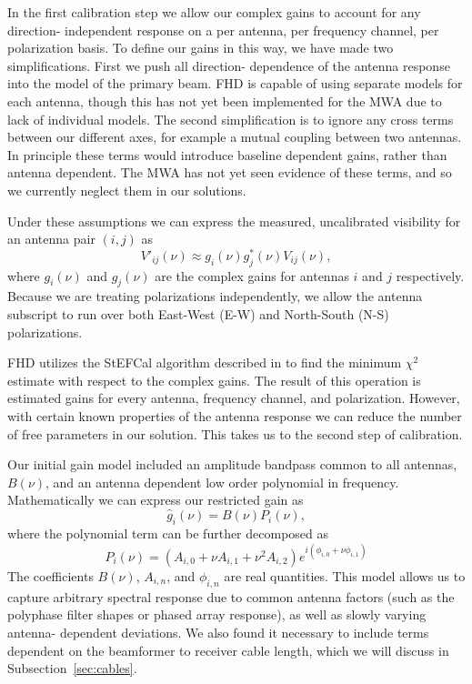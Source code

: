 \documentclass[iop]{emulateapj}
\begin{document}
In the first calibration step we allow our complex gains to account for any direction-
independent response on a per antenna, per frequency channel, per polarization basis. To 
define our gains in this way, we have made two simplifications. First we push all direction-
dependence of the antenna response into the model of the primary beam. FHD is capable 
of using separate models for each antenna, though this has not yet been implemented for 
the MWA due to lack of individual models. The second simplification is to ignore any cross 
terms between our different axes, for example a mutual coupling between two antennas. In 
principle these terms would introduce baseline dependent gains, rather than antenna 
dependent. The MWA has not yet seen evidence of these terms, and so we currently 
neglect them in our solutions.

Under these assumptions we can express the measured, uncalibrated visibility for an 
antenna pair $(i,j)$ as
\begin{equation}
V'_{ij}(\nu) \approx g_i(\nu)g^*_j(\nu)V_{ij}(\nu),
\end{equation}
where $g_i(\nu)$ and $g_j(\nu)$ are the complex gains for antennas $i$ and $j$ 
respectively. Because we are treating polarizations independently, we allow the antenna 
subscript to run over both East-West (E-W) and North-South (N-S) polarizations.

FHD utilizes the StEFCal algorithm described in \citealt{Salvini:2014} to find the minimum 
$\chi^2$ estimate with respect to the complex gains. The result of this operation is 
estimated gains for every antenna, frequency channel, and polarization. However, with 
certain known properties of the antenna response we can reduce the number of free 
parameters in our solution. This takes us to the second step of calibration.

Our initial gain model included an amplitude bandpass common to all antennas, $B(\nu)$, 
and an antenna dependent low order polynomial in frequency. Mathematically we can 
express our restricted gain as
\begin{equation}\label{eq:cal1}
\hat{g}_i(\nu)=B(\nu)P_i(\nu),
\end{equation}
where the polynomial term can be further decomposed as
\begin{equation}
P_i(\nu) = (A_{i,0} + \nu A_{i,1} + \nu^2 A_{i,2})e^{i (\phi_{i,0} + \nu \phi_{i,1})}
\end{equation}
The coefficients $B(\nu)$, $A_{i,n}$, and $\phi_{i,n}$ are real quantities. This model allows 
us to capture arbitrary spectral response due to common antenna factors (such as the 
polyphase filter shapes or phased array response), as well as slowly varying antenna-
dependent deviations. We also found it necessary to include terms dependent on the 
beamformer to receiver cable length, which we will discuss in Subsection~\ref{sec:cables}.
\end{document}
